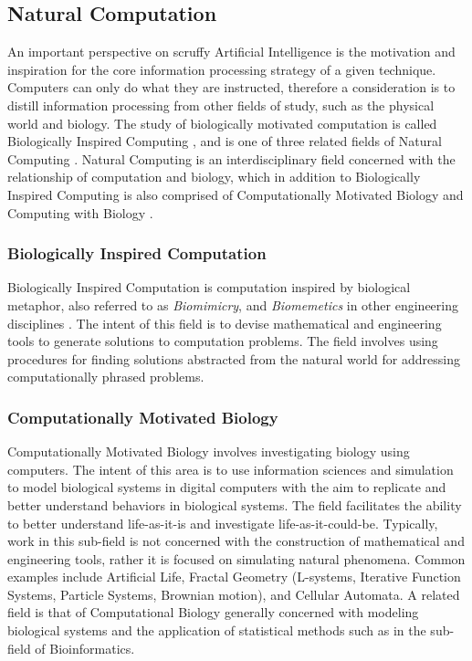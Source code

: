 \begin{bibunit}
\subsection{Natural Computation}
\label{sec:natural_computation}
An important perspective on scruffy Artificial Intelligence is the motivation and inspiration for the core information processing strategy of a given technique. Computers can only do what they are instructed, therefore a consideration is to distill information processing from other fields of study, such as the physical world and biology. The study of biologically motivated computation is called Biologically Inspired Computing \cite{Castro2005a}, and is one of three related fields of Natural Computing \cite{Forbes2000, Forbes2005, Paton1994}. 
Natural Computing is an interdisciplinary field concerned with the relationship of computation and biology, which in addition to Biologically Inspired Computing is also comprised of Computationally Motivated Biology and Computing with Biology \cite{Paun2005, Marrow2000}.

\subsubsection{Biologically Inspired Computation}
Biologically Inspired Computation is computation inspired by biological metaphor, also referred to as \emph{Biomimicry}, and \emph{Biomemetics} in other engineering disciplines \cite{Castro2005, Benyus1998}. The intent of this field is to devise mathematical and engineering tools to generate solutions to computation problems. The field involves using procedures for finding solutions abstracted from the natural world for addressing computationally phrased problems.

\subsubsection{Computationally Motivated Biology}
Computationally Motivated Biology involves investigating biology using computers. The intent of this area is to use information sciences and simulation to model biological systems in digital computers with the aim to replicate and better understand behaviors in biological systems. The field facilitates the ability to better understand life-as-it-is and investigate life-as-it-could-be. Typically, work in this sub-field is not concerned with the construction of mathematical and engineering tools, rather it is focused on simulating natural phenomena. Common examples include Artificial Life, Fractal Geometry (L-systems, Iterative Function Systems, Particle Systems, Brownian motion), and Cellular Automata. A related field is that of Computational Biology generally concerned with modeling biological systems and the application of statistical methods such as in the sub-field of Bioinformatics.


\end{bibunit}
